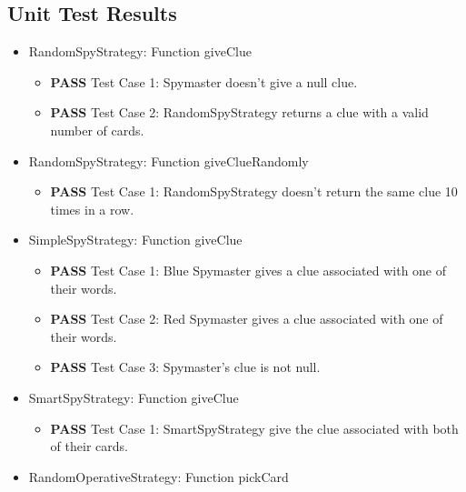 \documentclass[12pt]{article}
\begin{document}
\subsection{Unit Test Results}
\begin{itemize}
\item RandomSpyStrategy: Function giveClue

    \begin{itemize}
        \item \textbf{PASS} Test Case 1: Spymaster doesn’t give a null clue.
        \item \textbf{PASS} Test Case 2: RandomSpyStrategy returns a clue with a valid number of cards.
    \end{itemize}

\item RandomSpyStrategy: Function giveClueRandomly

    \begin{itemize}
        \item \textbf{PASS} Test Case 1: RandomSpyStrategy doesn’t return the same clue 10 times in a row.
    \end{itemize}


\item SimpleSpyStrategy: Function giveClue

    \begin{itemize}
        \item \textbf{PASS} Test Case 1: Blue Spymaster gives a clue associated with one of their words.
        \item \textbf{PASS} Test Case 2: Red Spymaster gives a clue associated with one of their words.
        \item \textbf{PASS} Test Case 3: Spymaster’s clue is not null.
    \end{itemize}


\item SmartSpyStrategy: Function giveClue

    \begin{itemize}
        \item \textbf{PASS} Test Case 1: SmartSpyStrategy give the clue associated with both of their cards.
    \end{itemize}


\item RandomOperativeStrategy: Function pickCard


\end{itemize}
\end{document}
